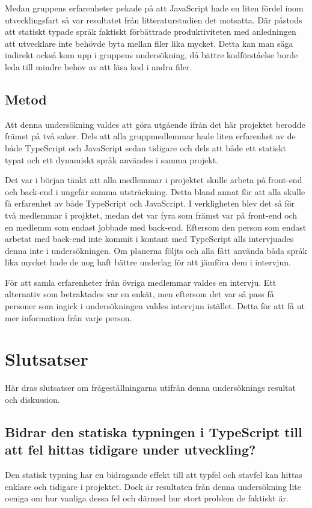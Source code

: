 Medan gruppens erfarenheter pekade på att JavaScript hade en liten fördel inom utvecklingsfart så var resultatet från litteraturstudien det motsatta. Där påstods att statiskt typade språk faktiskt förbättrade produktiviteten med anledningen att utvecklare inte behövde byta mellan filer lika mycket. \cite{henrik_maintainability} Detta kan man säga indirekt också kom upp i gruppens undersökning, då bättre kodförståelse borde leda till mindre behov av att läsa kod i andra filer.
\subsection{Metod}
Att denna undersökning valdes att göra utgående ifrån det här projektet berodde främst på två saker. Dels att alla gruppmedlemmar hade liten erfarenhet av de både TypeScript och JavaScript sedan tidigare och dels att både ett statiskt typat och ett dynamiskt språk användes i samma projekt.

Det var i början tänkt att alla medlemmar i projektet skulle arbeta på front-end och back-end i ungefär samma utsträckning. Detta bland annat för att alla skulle få erfarenhet av både TypeScript och JavaScript. I verkligheten blev det så för två medlemmar i projktet, medan det var fyra som främst var på front-end och en medlemm som endast jobbade med back-end. Eftersom den person som endast arbetat med back-end inte kommit i kontant med TypeScript alls intervjuades denna inte i undersökningen. Om planerna följts och alla fått använda båda språk lika mycket hade de nog haft bättre underlag för att jämföra dem i intervjun.

För att samla erfarenheter från övriga medlemmar valdes en intervju. Ett alternativ som betraktades var en enkät, men eftersom det var så pass få personer som ingick i undersökningen valdes intervjun istället. Detta för att få ut mer information från varje person.

\section{Slutsatser}
Här dras slutsatser om frågeställningarna utifrån denna undersöknings resultat och diskussion.
\subsection{Bidrar den statiska typningen i TypeScript till att fel hittas tidigare under utveckling?}
Den statisk typning har en bidragande effekt till att typfel och stavfel kan hittas enklare och tidigare i projektet. Dock är resultaten från denna undersökning lite oeniga om hur vanliga dessa fel och därmed hur stort problem de faktiskt är.

